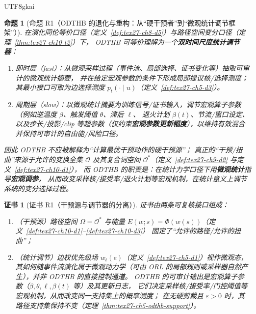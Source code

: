 \documentclass[12pt]{article}
\newtheorem{proposition}{命题}[section]
\newtheorem{Certificate}{证书}[section]
\begin{document}
\begin{CJK*}{UTF8}{gkai}
\begin{proposition}[命题 R1（ODTHB 的退化与重构：从“硬干预者”到“微观统计调节框架”）]
\label{prop:tex27-ch5-odthb-r1}
在演化同伦等价口径（定义~\ref{def:tex27-ch8-d5}）与路径空间变分口径（定理~\ref{thm:tex27-ch10-t2}）下，
ODTHB 可等价理解为一个\textbf{双时间尺度统计调节器}：
\begin{enumerate}
  \item 即时层（fast）：从微观采样过程（事件流、局部选择、证书变化等）抽取可审计的微观统计摘要，
  并在给定宏观参数的条件下形成局部提议核/选择测度；其最小接口可取为边选择测度 $p_t(\cdot\mid u)$（定义~\ref{def:tex27-ch5-d3}）。
  \item 周期层（slow）：以微观统计摘要为训练信号/证书输入，调节宏观算子参数（例如逆温度 $\beta$、触发阈值 $\theta$、滞后 $\ell$、
  退火计划 $\beta(t)$、节流/窗口设定、以及步长/投影/clip 等超参数（仅约束\textbf{宏观参数更新幅度}），以维持有效混合并保持可审计的自由能/风险口径。
\end{enumerate}
因此 ODTHB 不应被解释为“计算最优干预动作的硬干预源”；
真正的“干预/扭曲”来源于允许的变换全集 $\mathcal{O}$ 及其复合词空间 $\mathcal{O}^*$（定义~\ref{def:tex27-ch9-d2} 与定义~\ref{def:tex27-ch10-d1}），
而 ODTHB 的职责是：在统计力学口径下用\textbf{微观统计}指导\textbf{宏观调参}，
从而改变采样核/接受率/退火计划等宏观机制，在统计意义上调节系统的变分选择过程。
\end{proposition}

\begin{Certificate}[证书 R1（干预源与调节器的分离）]
\label{cert:tex27-ch5-odthb-r1}
证书由两条可复核接口组成：
\begin{enumerate}
  \item（干预源）路径空间 $\Omega=\mathcal{O}^*$ 与能量 $E(w;s)=\Phi(w(s))$（定义~\ref{def:tex27-ch10-d1}--\ref{def:tex27-ch10-d3}）
    固定了“允许的路径/允许的扭曲”；
  \item（统计调节）边权优先级场 $w_t(e)$（定义~\ref{def:tex27-ch5-d1}）视作微观态，
  其如何随事件流演化属于微观动力学（可由 ORL 的局部规则或采样器自然产生），并非 ODTHB 的直接控制通道。
  ODTHB 的可审计输出是宏观算子参数（$\beta,\theta,\ell,\beta(t)$ 等）及其更新日志，
  它们决定采样核/接受率/门控阈值等宏观机制，从而改变同一支持集上的概率测度；
  在无硬剪裁且 $\varepsilon>0$ 时，其路径支持集保持不变（定理~\ref{thm:tex27-ch5-odthb-support}）。
\end{enumerate}
\end{Certificate}


\end{CJK*}
\end{document}
